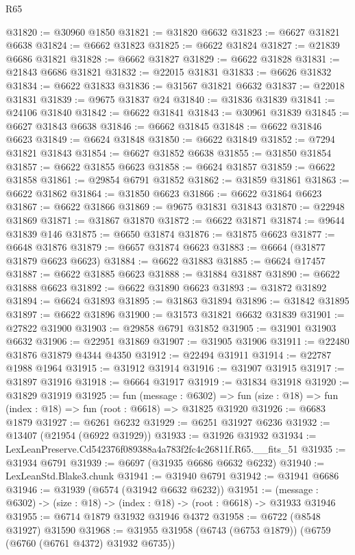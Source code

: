 \begin{lexlean}{R65}
\begin{coremodule}
{@31820 := @30960 @1850
@31821 := @31820 @6632
@31823 := @6627 @31821 @6638
@31824 := @6662 @31823
@31825 := @6622 @31824
@31827 := @21839 @6686 @31821
@31828 := @6662 @31827
@31829 := @6622 @31828
@31831 := @21843 @6686 @31821
@31832 := @22015 @31831
@31833 := @6626 @31832
@31834 := @6622 @31833
@31836 := @31567 @31821 @6632
@31837 := @22018 @31831
@31839 := @9675 @31837 @24
@31840 := @31836 @31839
@31841 := @24106 @31840
@31842 := @6622 @31841
@31843 := @30961 @31839
@31845 := @6627 @31843 @6638
@31846 := @6662 @31845
@31848 := @6622 @31846 @6623
@31849 := @6624 @31848
@31850 := @6622 @31849
@31852 := @7294 @31821 @31843
@31854 := @6627 @31852 @6638
@31855 := @31850 @31854
@31857 := @6622 @31855 @6623
@31858 := @6624 @31857
@31859 := @6622 @31858
@31861 := @29854 @6791 @31852
@31862 := @31859 @31861
@31863 := @6622 @31862
@31864 := @31850 @6623
@31866 := @6622 @31864 @6623
@31867 := @6622 @31866
@31869 := @9675 @31831 @31843
@31870 := @22948 @31869
@31871 := @31867 @31870
@31872 := @6622 @31871
@31874 := @9644 @31839 @146
@31875 := @6650 @31874
@31876 := @31875 @6623
@31877 := @6648 @31876
@31879 := @6657 @31874 @6623
@31883 := @6664 (@31877 @31879 @6623 @6623)
@31884 := @6622 @31883
@31885 := @6624 @17457
@31887 := @6622 @31885 @6623
@31888 := @31884 @31887
@31890 := @6622 @31888 @6623
@31892 := @6622 @31890 @6623
@31893 := @31872 @31892
@31894 := @6624 @31893
@31895 := @31863 @31894
@31896 := @31842 @31895
@31897 := @6622 @31896
@31900 := @31573 @31821 @6632 @31839
@31901 := @27822 @31900
@31903 := @29858 @6791 @31852
@31905 := @31901 @31903 @6632
@31906 := @22951 @31869
@31907 := @31905 @31906
@31911 := @22480 @31876 @31879 @4344 @4350
@31912 := @22494 @31911
@31914 := @22787 @1988 @1964
@31915 := @31912 @31914
@31916 := @31907 @31915
@31917 := @31897 @31916
@31918 := @6664 @31917
@31919 := @31834 @31918
@31920 := @31829 @31919
@31925 := fun (message : @6302) =>
  fun (size : @18) => fun (index : @18) => fun (root : @6618) => @31825 @31920
@31926 := @6683 @1879
@31927 := @6261 @6232
@31929 := @6251 @31927 @6236
@31932 := @13407 (@21954 (@6922 @31929))
@31933 := @31926 @31932
@31934 := LexLeanPreserve.Cd542376f089388a4a783f2fc4c26811f.R65.__fits_51
@31935 := @31934 @6791
@31939 := @6697 (@31935 @6686 @6632 @6232)
@31940 := LexLeanStd.Blake3.chunk
@31941 := @31940 @6791
@31942 := @31941 @6686
@31946 := @31939 (@6574 (@31942 @6632 @6232))
@31951 := (message : @6302) -> (size : @18) -> (index : @18) -> (root : @6618) -> @31933 @31946
@31955 := @6714 @1879 @31932 @31946 @4372
@31958 := @6722 (@8548 @31927) @31590
@31968 := @31955 @31958 (@6743 (@6753 @1879)) (@6759 (@6760 (@6761 @4372) @31932 @6735))
}
\end{coremodule}
\end{lexlean}
